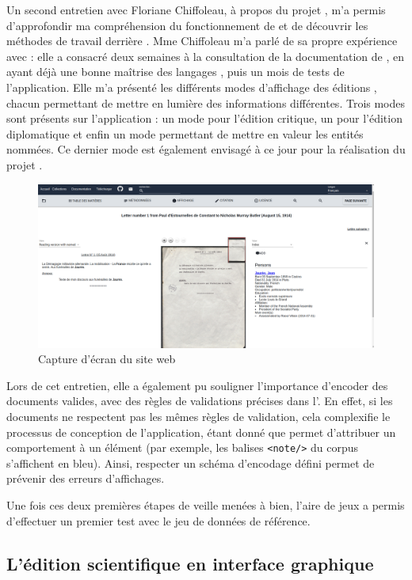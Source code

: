 Un second entretien avec Floriane Chiffoleau, à propos du projet \disco, m'a permis d'approfondir ma compréhension du fonctionnement de \tp et de découvrir les méthodes de travail derrière \disco. Mme Chiffoleau m'a parlé de sa propre expérience avec \tp : elle a consacré deux semaines à la consultation de la documentation de \tp, en ayant déjà une bonne maîtrise des langages \XML, puis un mois de tests de l'application. Elle m'a présenté les différents modes d'affichage des éditions \disco, chacun permettant de mettre en lumière des informations différentes. Trois modes sont présents sur l'application \disco : un mode pour l'édition critique, un pour l'édition diplomatique et enfin un mode permettant de mettre en valeur les entités nommées. Ce dernier mode est également envisagé à ce jour pour la réalisation du projet \COREL. 

\begin{figure}[h]
    \centering
    \includegraphics[width=\textwidth]{images/discholed.png}
    \caption{Capture d'écran du site web \disco}
\end{figure}

Lors de cet entretien, elle a également pu souligner l'importance d'encoder des documents \TEI valides, avec des règles de validations précises dans l'\ODD. En effet, si les documents ne respectent pas les mêmes règles de validation, cela complexifie le processus de conception de l'application, étant donné que \tp permet d'attribuer un comportement à un élément (par exemple, les balises \texttt{<note/>} du corpus \COREL s'affichent en bleu). Ainsi, respecter un schéma d'encodage défini permet de prévenir des erreurs d'affichages. 

Une fois ces deux premières étapes de veille menées à bien, l'aire de jeux \tp a permis d'effectuer un premier test avec le jeu de données \TEI de référence. 

\subsection{L’édition scientifique en interface graphique}

